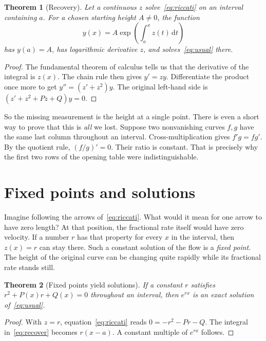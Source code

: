 \documentclass[11pt,a4paper]{amsart}
\newcommand{\dif}{\mathrm{d}}
\newtheorem{theorem}{Theorem}[section]
\theoremstyle{definition}
\theoremstyle{remark}
\begin{document}
\begin{theorem}[Recovery]\label{thm:recovery}
Let a continuous \(z\) solve~\eqref{eq:riccati} on an interval containing \(a\). For a chosen starting height \(A\ne0\), the function
\begin{equation}\label{eq:recover}
 y(x)=A\exp\!\left(\int_a^x z(t)\,\dif t\right)
\end{equation}
has \(y(a)=A\), has logarithmic derivative \(z\), and solves~\eqref{eq:usual} there.
\end{theorem}
\begin{proof}
The fundamental theorem of calculus tells us that the derivative of the integral is \(z(x)\). The chain rule then gives \(y'=zy\). Differentiate the product once more to get \(y''=(z'+z^2)y\). The original left-hand side is \((z'+z^2+Pz+Q)y=0\).
\end{proof}
So the missing measurement is the height at a single point. There is even a short way to prove that this is \emph{all} we lost. Suppose two nonvanishing curves \(f,g\) have the same last column throughout an interval. Cross-multiplication gives \(f'g=fg'\). By the quotient rule, \((f/g)'=0\). Their ratio is constant. That is precisely why the first two rows of the opening table were indistinguishable.

\section{Fixed points and solutions}
Imagine following the arrows of~\eqref{eq:riccati}. What would it mean for one arrow to have zero length? At that position, the fractional rate itself would have zero velocity. If a number \(r\) has that property for every \(x\) in the interval, then \(z(x)=r\) can stay there. Such a constant solution of the flow is a \emph{fixed point}. The height of the original curve can be changing quite rapidly while its fractional rate stands still.

\begin{theorem}[Fixed points yield solutions]\label{thm:fixed-pts}
If a constant \(r\) satisfies \(r^2+P(x)r+Q(x)=0\) throughout an interval, then \(e^{rx}\) is an exact solution of~\eqref{eq:usual}.
\end{theorem}
\begin{proof}
With \(z=r\), equation~\eqref{eq:riccati} reads \(0=-r^2-Pr-Q\). The integral in~\eqref{eq:recover} becomes \(r(x-a)\). A constant multiple of \(e^{rx}\) follows.
\end{proof}
\end{document}
